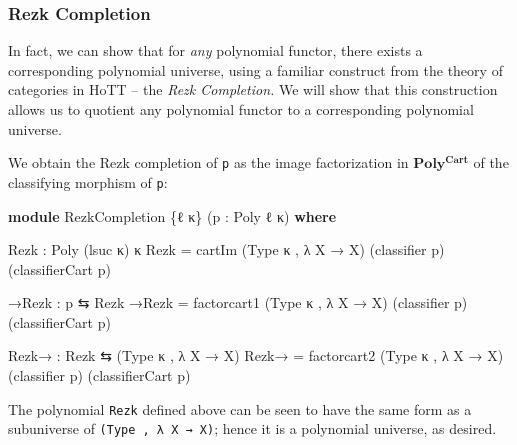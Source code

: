 \documentclass[
  11pt,
  oneside,
  article]{memoir}
\newenvironment{Shaded}{}{}
\newcommand{\KeywordTok}[1]{\textcolor[rgb]{0.00,0.44,0.13}{\textbf{#1}}}
\newcommand{\NormalTok}[1]{#1}
\newcommand{\OtherTok}[1]{\textcolor[rgb]{0.00,0.44,0.13}{#1}}
\theoremstyle{definition}
\theoremstyle{plain}
\newcommand{\0}{\textsf{0}}
\newcommand{\1}{\tn{\textsf{1}}}
\begin{document}
\subsubsection{Rezk Completion}\label{rezk-completion}

In fact, we can show that for \emph{any} polynomial functor, there
exists a corresponding polynomial universe, using a familiar construct
from the theory of categories in HoTT -- the \emph{Rezk Completion.} We
will show that this construction allows us to quotient any polynomial
functor to a corresponding polynomial universe.

We obtain the Rezk completion of \texttt{p} as the image factorization
in \(\mathbf{Poly^{Cart}}\) of the classifying morphism of \texttt{p}:

\begin{Shaded}
\begin{Highlighting}[]
\KeywordTok{module}\NormalTok{ RezkCompletion }\OtherTok{\{}\NormalTok{ℓ κ}\OtherTok{\}} \OtherTok{(}\NormalTok{p }\OtherTok{:}\NormalTok{ Poly ℓ κ}\OtherTok{)} \KeywordTok{where}

\NormalTok{    Rezk }\OtherTok{:}\NormalTok{ Poly }\OtherTok{(}\NormalTok{lsuc κ}\OtherTok{)}\NormalTok{ κ}
\NormalTok{    Rezk }\OtherTok{=}\NormalTok{ cartIm }\OtherTok{(}\NormalTok{Type κ , }\OtherTok{λ}\NormalTok{ X }\OtherTok{→}\NormalTok{ X}\OtherTok{)} \OtherTok{(}\NormalTok{classifier p}\OtherTok{)} \OtherTok{(}\NormalTok{classifierCart p}\OtherTok{)}

\NormalTok{    →Rezk }\OtherTok{:}\NormalTok{ p ⇆ Rezk}
\NormalTok{    →Rezk }\OtherTok{=}\NormalTok{ factorcart1 }\OtherTok{(}\NormalTok{Type κ , }\OtherTok{λ}\NormalTok{ X }\OtherTok{→}\NormalTok{ X}\OtherTok{)} \OtherTok{(}\NormalTok{classifier p}\OtherTok{)} \OtherTok{(}\NormalTok{classifierCart p}\OtherTok{)}

\NormalTok{    Rezk→ }\OtherTok{:}\NormalTok{ Rezk ⇆ }\OtherTok{(}\NormalTok{Type κ , }\OtherTok{λ}\NormalTok{ X }\OtherTok{→}\NormalTok{ X}\OtherTok{)}
\NormalTok{    Rezk→ }\OtherTok{=}\NormalTok{ factorcart2 }\OtherTok{(}\NormalTok{Type κ , }\OtherTok{λ}\NormalTok{ X }\OtherTok{→}\NormalTok{ X}\OtherTok{)} \OtherTok{(}\NormalTok{classifier p}\OtherTok{)} \OtherTok{(}\NormalTok{classifierCart p}\OtherTok{)}
\end{Highlighting}
\end{Shaded}

The polynomial \texttt{Rezk} defined above can be seen to have the same
form as a subuniverse of \texttt{(Type\ ,\ λ\ X\ →\ X)}; hence it is a
polynomial universe, as desired.
\end{document}
